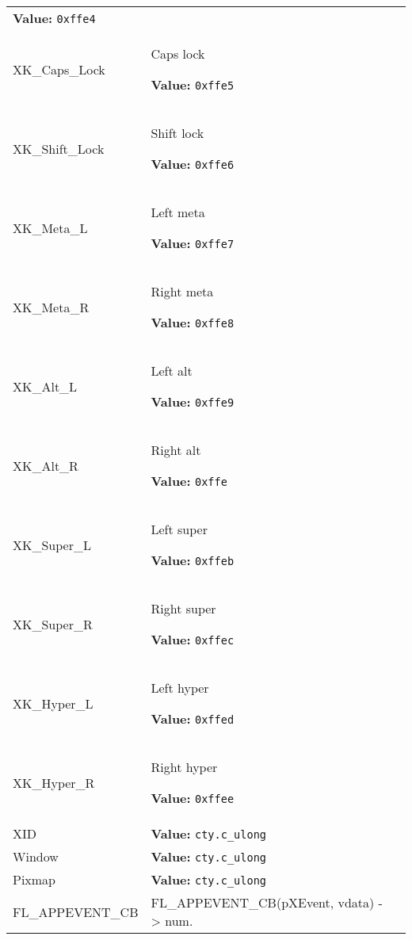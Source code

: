 \begin{longtable}{|p{\varnamewidth}|p{\vardescrwidth}|l}
\textbf{Value:} 
{\tt 0xffe4}&\\
\cline{1-2}
\raggedright X\-K\-\_\-C\-a\-p\-s\-\_\-L\-o\-c\-k\- & \raggedright Caps lock

\textbf{Value:} 
{\tt 0xffe5}&\\
\cline{1-2}
\raggedright X\-K\-\_\-S\-h\-i\-f\-t\-\_\-L\-o\-c\-k\- & \raggedright Shift lock

\textbf{Value:} 
{\tt 0xffe6}&\\
\cline{1-2}
\raggedright X\-K\-\_\-M\-e\-t\-a\-\_\-L\- & \raggedright Left meta

\textbf{Value:} 
{\tt 0xffe7}&\\
\cline{1-2}
\raggedright X\-K\-\_\-M\-e\-t\-a\-\_\-R\- & \raggedright Right meta

\textbf{Value:} 
{\tt 0xffe8}&\\
\cline{1-2}
\raggedright X\-K\-\_\-A\-l\-t\-\_\-L\- & \raggedright Left alt

\textbf{Value:} 
{\tt 0xffe9}&\\
\cline{1-2}
\raggedright X\-K\-\_\-A\-l\-t\-\_\-R\- & \raggedright Right alt

\textbf{Value:} 
{\tt 0xffe}&\\
\cline{1-2}
\raggedright X\-K\-\_\-S\-u\-p\-e\-r\-\_\-L\- & \raggedright Left super

\textbf{Value:} 
{\tt 0xffeb}&\\
\cline{1-2}
\raggedright X\-K\-\_\-S\-u\-p\-e\-r\-\_\-R\- & \raggedright Right super

\textbf{Value:} 
{\tt 0xffec}&\\
\cline{1-2}
\raggedright X\-K\-\_\-H\-y\-p\-e\-r\-\_\-L\- & \raggedright Left hyper

\textbf{Value:} 
{\tt 0xffed}&\\
\cline{1-2}
\raggedright X\-K\-\_\-H\-y\-p\-e\-r\-\_\-R\- & \raggedright Right hyper

\textbf{Value:} 
{\tt 0xffee}&\\
\cline{1-2}
\raggedright X\-I\-D\- & \raggedright \textbf{Value:} 
{\tt cty.c\_ulong}&\\
\cline{1-2}
\raggedright W\-i\-n\-d\-o\-w\- & \raggedright \textbf{Value:} 
{\tt cty.c\_ulong}&\\
\cline{1-2}
\raggedright P\-i\-x\-m\-a\-p\- & \raggedright \textbf{Value:} 
{\tt cty.c\_ulong}&\\
\cline{1-2}
\raggedright F\-L\-\_\-A\-P\-P\-E\-V\-E\-N\-T\-\_\-C\-B\- & \raggedright FL\_APPEVENT\_CB(pXEvent, vdata) -> num.


\end{longtable}
